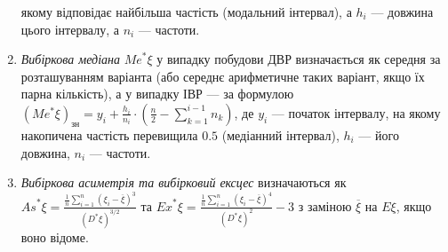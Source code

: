 \begin{enumerate}
    якому відповідає найбільша частість (модальний інтервал), а $h_i$ --- довжина цього інтервалу, а $n_i$ --- частоти.
    \item \emph{Вибіркова медіана} ${Me}^* \xi$ у випадку побудови ДВР визначається як середня за розташуванням варіанта (або середнє арифметичне 
    таких варіант, якщо їх парна кількість), а у випадку ІВР --- за формулою 
    $(Me^* \xi)_{\text{зн}} = y_i + \frac{h_i}{n_i} \cdot \left(\frac{n}{2} - \sum\limits_{k=1}^{i-1} n_k \right)$, де 
    $y_i$ --- початок інтервалу, на якому накопичена частість перевищила $0.5$ (медіанний інтервал), $h_i$ --- його довжина,
    $n_i$ --- частоти.
    \item \emph{Вибіркова асиметрія та вибірковий ексцес} визначаються як 
    ${As}^* \xi = \frac{\frac{1}{n}\sum\limits_{i=1}^n \left(\xi_i - \overline{\xi} \right)^3}{(D^*\xi)^{3/2}}$ та
    ${Ex}^* \xi = \frac{\frac{1}{n}\sum\limits_{i=1}^n \left(\xi_i - \overline{\xi} \right)^4}{(D^*\xi)^{2}} - 3$ з заміною
    $\overline{\xi}$ на $E\xi$, якщо воно відоме.
\end{enumerate}